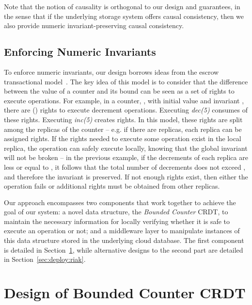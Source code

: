 \documentclass[conference]{IEEEtran}
\newcommand{\InvCounter}{\emph{Bounded Counter}}
\begin{document}
Note that the notion of causality is orthogonal to our design and guarantees, in the sense that if the underlying storage system offers causal consistency, then we  also provide numeric invariant-preserving causal consistency.


\subsection{Enforcing Numeric Invariants}\label{sec:model:overview}

To enforce numeric invariants, our design borrows ideas from 
the escrow transactional model~\cite{escrow}. 
The key idea of this model is to consider that the difference between the 
value of a counter and its bound can be seen as a set of rights to execute operations. 
For example, in a counter, , with initial value  and invariant , 
there are  () rights to execute decrement operations. 
Executing \emph{dec(5)} consumes  of these rights. 
Executing \emph{inc(5)} creates  rights.
In this model, these rights are split among the replicas of the 
counter -- e.g. if there are  replicas, each replica can be assigned  rights.
If the rights needed to execute some operation exist in the local replica, 
the operation can safely execute locally, knowing that the global 
invariant will not be broken -- in the previous example, 
if the decrements of each replica are less or equal to , it follows that the total 
number of decrements does not exceed , and therefore the invariant is preserved.
If not enough rights exist, then either the operation fails or additional rights 
must be obtained from other replicas.

Our approach encompasses two components that work together to achieve the goal of our system: 
a novel data structure, the \InvCounter{} CRDT, to maintain the necessary information for 
locally verifying whether it is safe to execute an operation or not; and 
a middleware layer to manipulate instances of this data structure stored in
the underlying cloud database. 
The first component is detailed in Section~\ref{sec:crdt}, 
while alternative designs to the second part are detailed in Section~\ref{sec:deploy:riak}.
















\section{Design of Bounded Counter CRDT}\label{sec:crdt}
\end{document}
